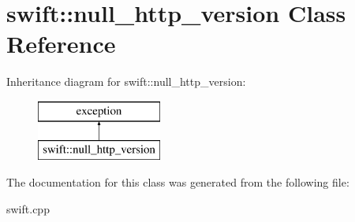 \hypertarget{classswift_1_1null__http__version}{\section{swift\-:\-:null\-\_\-http\-\_\-version Class Reference}
\label{classswift_1_1null__http__version}
}
Inheritance diagram for swift\-:\-:null\-\_\-http\-\_\-version\-:\begin{figure}[H]
\begin{center}
\leavevmode
\includegraphics[height=2.000000cm]{classswift_1_1null__http__version}
\end{center}
\end{figure}


The documentation for this class was generated from the following file\-:\begin{DoxyCompactItemize}
\item 
swift.\-cpp\end{DoxyCompactItemize}
